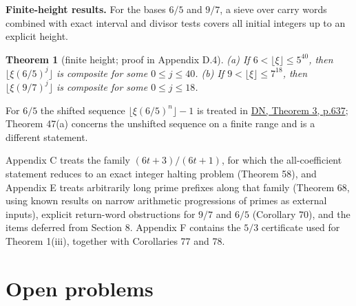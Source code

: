 \documentclass[11pt,reqno]{amsart}
\newtheorem{theorem}{Theorem}
\theoremstyle{definition}
\theoremstyle{remark}
\begin{document}
\textbf{Finite-height results.} For the bases \(6/5\) and \(9/7\), a sieve
over carry words combined with exact interval and divisor tests covers
all initial integers up to an explicit height.

\begin{samepage}
\begin{theorem}[finite height; proof in Appendix D.4]\leavevmode\label{thm:47}
(a) If \(6<\lfloor\xi\rfloor\le5^{40}\), then
\(\lfloor\xi(6/5)^j\rfloor\) is composite for some \(0\le j\le40\).
(b) If \(9<\lfloor\xi\rfloor\le7^{18}\), then
\(\lfloor\xi(9/7)^j\rfloor\) is composite for some \(0\le j\le18\).
\label{thm-end:47}
\end{theorem}
\end{samepage}

For \(6/5\) the shifted sequence
\(\lfloor\xi(6/5)^n\rfloor-1\) is treated in
\hyperref[ref-dn]{DN, Theorem 3, p.637}; Theorem 47(a) concerns the unshifted
sequence on a finite range and is a different statement.

Appendix C treats the family \((6t+3)/(6t+1)\), for which the
all-coefficient statement reduces to an exact integer halting problem
(Theorem 58), and Appendix E treats arbitrarily long prime prefixes
along that family (Theorem 68, using known results on narrow arithmetic
progressions of primes as external inputs), explicit return-word
obstructions for \(9/7\) and \(6/5\) (Corollary 70), and the items
deferred from Section 8. Appendix F contains the \(5/3\) certificate
used for Theorem 1(iii), together with Corollaries 77 and 78.

\section{Open problems}\label{sec:11}
\end{document}
